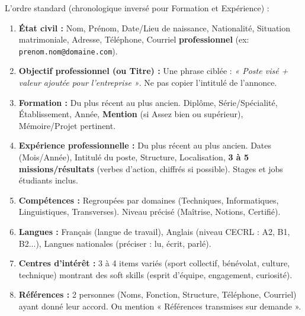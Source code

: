 \documentclass[11pt]{article}
\begin{document}
\begin{propriete}
L'ordre standard (chronologique inversé pour Formation et Expérience) :
\begin{enumerate}
\item \textbf{État civil :} Nom, Prénom, Date/Lieu de naissance, Nationalité, Situation matrimoniale, Adresse, Téléphone, Courriel \textbf{professionnel} (ex: \texttt{prenom.nom@domaine.com}).
\item \textbf{Objectif professionnel (ou Titre) :} Une phrase ciblée : \emph{« Poste visé + valeur ajoutée pour l'entreprise »}. Ne pas copier l'intitulé de l'annonce.
\item \textbf{Formation :} Du plus récent au plus ancien. Diplôme, Série/Spécialité, Établissement, Année, \textbf{Mention} (si Assez bien ou supérieur), Mémoire/Projet pertinent.
\item \textbf{Expérience professionnelle :} Du plus récent au plus ancien. Dates (Mois/Année), Intitulé du poste, Structure, Localisation, \textbf{3 à 5 missions/résultats} (verbes d'action, chiffrés si possible). Stages et jobs étudiants inclus.
\item \textbf{Compétences :} Regroupées par domaines (Techniques, Informatiques, Linguistiques, Transverses). Niveau précisé (Maîtrise, Notions, Certifié).
\item \textbf{Langues :} Français (langue de travail), Anglais (niveau CECRL : A2, B1, B2...), Langues nationales (préciser : lu, écrit, parlé).
\item \textbf{Centres d'intérêt :} 3 à 4 items variés (sport collectif, bénévolat, culture, technique) montrant des soft skills (esprit d'équipe, engagement, curiosité).
\item \textbf{Références :} 2 personnes (Noms, Fonction, Structure, Téléphone, Courriel) ayant donné leur accord. Ou mention « Références transmises sur demande ».
\end{enumerate}
\end{propriete}
\end{document}
